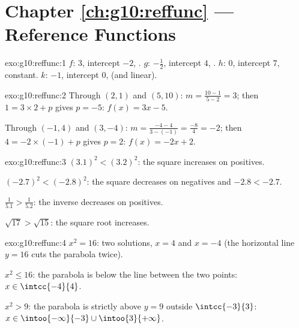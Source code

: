 \section*{Chapter \ref{ch:g10:reffunc} --- Reference Functions}

\begin{solution}{exo:g10:reffunc:1}
$f$:  $3$, intercept $-2$, . \quad
$g$:  $-\frac12$, intercept $4$, . \quad
$h$:  $0$, intercept $7$, constant. \quad
$k$:  $-1$, intercept $0$,  (and linear).
\end{solution}

\begin{solution}{exo:g10:reffunc:2}
Through $(2,1)$ and $(5,10)$:  $m = \frac{10 - 1}{5 - 2} = 3$; then
$1 = 3 \times 2 + p$ gives $p = -5$: $f(x) = 3x - 5$.

Through $(-1,4)$ and $(3,-4)$:  $m = \frac{-4 - 4}{3 - (-1)} =
\frac{-8}{4} = -2$; then $4 = -2 \times (-1) + p$ gives $p = 2$:
$f(x) = -2x + 2$.
\end{solution}

\begin{solution}{exo:g10:reffunc:3}
$(3.1)^2 < (3.2)^2$: the square increases on positives.

$(-2.7)^2 < (-2.8)^2$: the square decreases on negatives and
$-2.8 < -2.7$.

$\frac{1}{5.1} > \frac{1}{5.2}$: the inverse decreases on positives.

$\sqrt{17} > \sqrt{15}$: the square root increases.
\end{solution}

\begin{solution}{exo:g10:reffunc:4}
$x^2 = 16$: two solutions, $x = 4$ and $x = -4$ (the horizontal line
$y = 16$ cuts the parabola twice).

$x^2 \leq 16$: the parabola is below the line between the two
 points: $x \in \intcc{-4}{4}$.

$x^2 > 9$: the parabola is strictly above $y = 9$ outside
$\intcc{-3}{3}$: $x \in \intoo{-\infty}{-3} \cup \intoo{3}{+\infty}$.
\end{solution}

